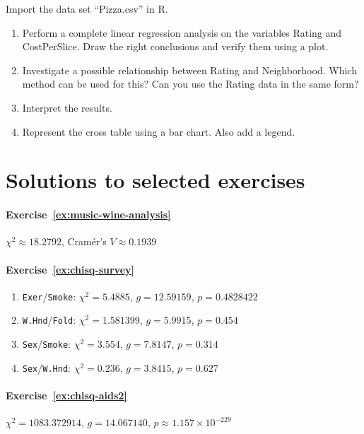 \begin{exercise}
  \label{ex:pizza}
  Import the data set ``Pizza.csv'' in R.
  \begin{enumerate}
    \item Perform a complete linear regression analysis on the variables  Rating and CostPerSlice. Draw the right conclusions and verify them using a plot.
    \item Investigate a possible relationship between Rating and Neighborhood. Which method can be used for this? Can you use the Rating data in the same form?
    \item Interpret the results.
    \item Represent the cross table using a bar chart. Also add a legend.
  \end{enumerate}
\end{exercise}





\section{Solutions to selected exercises}
\label{ssec:bivariate-analysis-solutions}

\paragraph{Exercise~\ref{ex:music-wine-analysis}}

$\chi^2 \approx 18.2792$, Cramér's $V \approx 0.1939$

\paragraph{Exercise~\ref{ex:chisq-survey}}

\begin{enumerate}
  \item \texttt{Exer}/\texttt{Smoke}: $\chi^2 = 5.4885$, $g = 12.59159$, $p = 0.4828422$
  \item \texttt{W.Hnd}/\texttt{Fold}: $\chi^2 = 1.581399$, $g = 5.9915$, $p = 0.454$
  \item \texttt{Sex}/\texttt{Smoke}: $\chi^2 = 3.554$, $g = 7.8147$, $p = 0.314$
  \item \texttt{Sex}/\texttt{W.Hnd}: $\chi^2 = 0.236$, $g = 3.8415$, $p = 0.627$
\end{enumerate}

\paragraph{Exercise~\ref{ex:chisq-aids2}} $\chi^2 = 1083.372914$, $g = 14.067140$, $p \approx 1.157 \times 10^{-229}$

